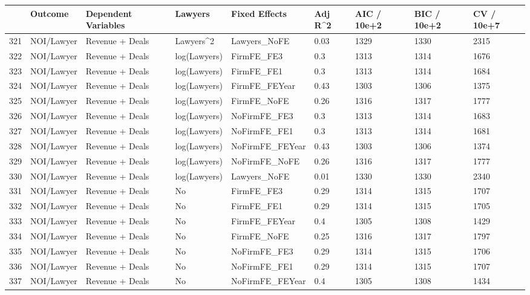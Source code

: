 \documentclass{article}
\begin{document}
\begin{table}[H]
\centering
\begin{tabular}{rllllllll}
  \hline
 & Outcome & Dependent Variables & Lawyers & Fixed Effects & Adj R^2 & AIC / 10e+2 & BIC / 10e+2 & CV / 10e+7 \\ 
  \hline
321 & NOI/Lawyer & Revenue + Deals & Lawyers^2 & Lawyers\_NoFE & 0.03 & 1329 & 1330 & 2315 \\ 
  322 & NOI/Lawyer & Revenue + Deals & log(Lawyers) & FirmFE\_FE3 & 0.3 & 1313 & 1314 & 1676 \\ 
  323 & NOI/Lawyer & Revenue + Deals & log(Lawyers) & FirmFE\_FE1 & 0.3 & 1313 & 1314 & 1684 \\ 
  324 & NOI/Lawyer & Revenue + Deals & log(Lawyers) & FirmFE\_FEYear & 0.43 & 1303 & 1306 & 1375 \\ 
  325 & NOI/Lawyer & Revenue + Deals & log(Lawyers) & FirmFE\_NoFE & 0.26 & 1316 & 1317 & 1777 \\ 
  326 & NOI/Lawyer & Revenue + Deals & log(Lawyers) & NoFirmFE\_FE3 & 0.3 & 1313 & 1314 & 1683 \\ 
  327 & NOI/Lawyer & Revenue + Deals & log(Lawyers) & NoFirmFE\_FE1 & 0.3 & 1313 & 1314 & 1681 \\ 
  328 & NOI/Lawyer & Revenue + Deals & log(Lawyers) & NoFirmFE\_FEYear & 0.43 & 1303 & 1306 & 1374 \\ 
  329 & NOI/Lawyer & Revenue + Deals & log(Lawyers) & NoFirmFE\_NoFE & 0.26 & 1316 & 1317 & 1777 \\ 
  330 & NOI/Lawyer & Revenue + Deals & log(Lawyers) & Lawyers\_NoFE & 0.01 & 1330 & 1330 & 2340 \\ 
  331 & NOI/Lawyer & Revenue + Deals & No & FirmFE\_FE3 & 0.29 & 1314 & 1315 & 1707 \\ 
  332 & NOI/Lawyer & Revenue + Deals & No & FirmFE\_FE1 & 0.29 & 1314 & 1315 & 1705 \\ 
  333 & NOI/Lawyer & Revenue + Deals & No & FirmFE\_FEYear & 0.4 & 1305 & 1308 & 1429 \\ 
  334 & NOI/Lawyer & Revenue + Deals & No & FirmFE\_NoFE & 0.25 & 1316 & 1317 & 1797 \\ 
  335 & NOI/Lawyer & Revenue + Deals & No & NoFirmFE\_FE3 & 0.29 & 1314 & 1315 & 1706 \\ 
  336 & NOI/Lawyer & Revenue + Deals & No & NoFirmFE\_FE1 & 0.29 & 1314 & 1315 & 1707 \\ 
  337 & NOI/Lawyer & Revenue + Deals & No & NoFirmFE\_FEYear & 0.4 & 1305 & 1308 & 1434 \\ 

\end{tabular}
\end{table}
\end{document}
